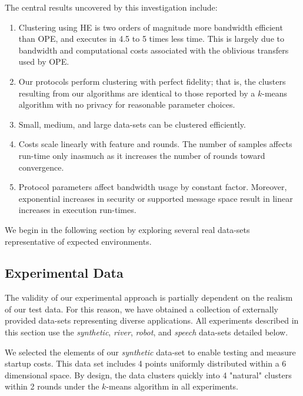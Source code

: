 The central results uncovered by this investigation include:

\newcommand{\itembase}{\setlength{\itemsep}{-3pt}}

\begin{enumerate}
\itembase

\item
Clustering using HE is two orders of magnitude more bandwidth
efficient than OPE, and executes in 4.5 to 5 times less time.  This is
largely due to bandwidth and computational costs associated with the
oblivious transfers used by OPE.

\item 
Our protocols perform clustering with perfect fidelity; that is, the clusters
resulting from our algorithms are identical to those reported by a
$k$-means algorithm with no privacy for reasonable parameter choices.

\item
Small, medium, and large data-sets can be clustered efficiently.

\item
Costs scale linearly with feature and rounds.  The number of samples
affects run-time only inasmuch as it increases the number of rounds
toward convergence.

\item
Protocol parameters affect bandwidth usage by constant factor.
Moreover, exponential increases in security or supported message space
result in linear increases in execution run-times.

\end{enumerate}

\noindent
We begin in the following section by exploring several real data-sets
representative of expected environments.

\subsection{Experimental Data}
\label{sec:exdata}

The validity of our experimental approach is partially dependent on
the realism of our test data.  For this reason, we have obtained a
collection of externally provided data-sets representing diverse
applications.  All experiments described in this section use the
{\it synthetic}, {\it river}, {\it robot}, and {\it speech} data-sets
detailed below.

We selected the elements of our {\it synthetic} data-set to enable
testing and measure startup costs.  This data set includes 4 points
uniformly distributed within a 6 dimensional space.  By design, the
data clusters quickly into 4 "natural" clusters within 2 rounds under
the $k$-means algorithm in all experiments.

